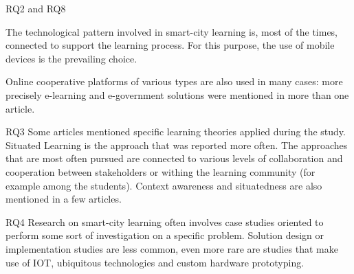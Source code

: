 RQ2 and RQ8

The technological pattern involved in smart-city learning is, most of the times, connected to support the learning process.
For this purpose, the use of mobile devices is the prevailing choice.

Online cooperative platforms of various types are also used in many cases: more precisely e-learning and e-government solutions were mentioned in more than one article.

RQ3
Some articles mentioned specific learning theories applied during the study. Situated Learning\cite{anderson_situated_1996} is the approach that was reported more often.
The approaches that are most often pursued are connected to various levels of collaboration and cooperation between stakeholders or withing the learning community (for example among the students). Context awareness and situatedness are also mentioned in a few articles.

RQ4
Research on smart-city learning often involves case studies oriented to perform some sort of investigation on a specific problem. Solution design or implementation studies are less common, even more rare are studies that make use of IOT, ubiquitous technologies and custom hardware prototyping.